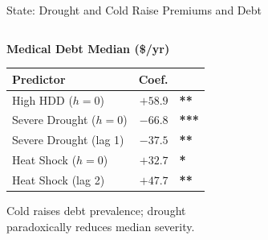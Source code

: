 \documentclass[aspectratio=169,11pt]{beamer}
\newcommand{\emphcolor}[1]{{\color{WarmOrange}\textbf{#1}}}
\newcommand{\tealtext}[1]{{\color{Teal}#1}}
\newcommand{\graytext}[1]{{\color{WarmGray}#1}}
\begin{document}
\begin{frame}{State: Drought and Cold Raise Premiums and Debt}
\begin{columns}[T]
\begin{column}{0.46\textwidth}
      \tealtext{\textbf{Medical Debt Median (\$/yr)}}\\[0.25em]
      \begin{tabular}{lrl}
        \toprule
        Predictor & Coef. & \\
        \midrule
        High HDD ($h{=}0$)       & $+58.9$  & \emphcolor{**}  \\
        Severe Drought ($h{=}0$) & $-66.8$  & \emphcolor{***} \\
        Severe Drought (lag 1)   & $-37.5$  & \emphcolor{**}  \\
        Heat Shock ($h{=}0$)     & $+32.7$  & \emphcolor{*}   \\
        Heat Shock (lag 2)       & $+47.7$  & \emphcolor{**}  \\
        \bottomrule
      \end{tabular}
      \vspace{0.2em}
      \graytext{\scriptsize Cold raises debt prevalence; drought\\paradoxically reduces median severity.}
    \end{column}
  \end{columns}
\end{frame}
\end{document}
